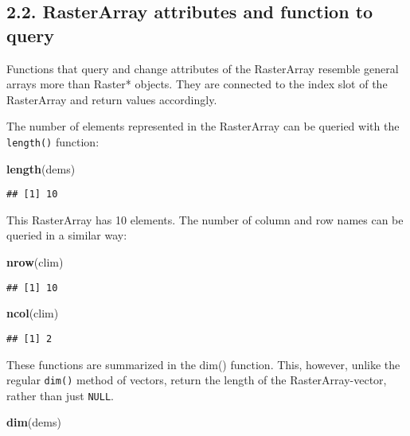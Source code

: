 \documentclass[]{article}
\newenvironment{Shaded}{\begin{snugshade}}{\end{snugshade}}
\newcommand{\KeywordTok}[1]{\textcolor[rgb]{0.13,0.29,0.53}{\textbf{#1}}}
\newcommand{\NormalTok}[1]{#1}
\begin{document}
\subsection{2.2. RasterArray attributes and function to
query}\label{rasterarray-attributes-and-function-to-query}

Functions that query and change attributes of the RasterArray resemble
general arrays more than Raster* objects. They are connected to the
index slot of the RasterArray and return values accordingly.

The number of elements represented in the RasterArray can be queried
with the \texttt{length()} function:

\begin{Shaded}
\begin{Highlighting}[]
\KeywordTok{length}\NormalTok{(dems)}
\end{Highlighting}
\end{Shaded}

\begin{verbatim}
## [1] 10
\end{verbatim}

This RasterArray has 10 elements. The number of column and row names can
be queried in a similar way:

\begin{Shaded}
\begin{Highlighting}[]
\KeywordTok{nrow}\NormalTok{(clim)}
\end{Highlighting}
\end{Shaded}

\begin{verbatim}
## [1] 10
\end{verbatim}

\begin{Shaded}
\begin{Highlighting}[]
\KeywordTok{ncol}\NormalTok{(clim)}
\end{Highlighting}
\end{Shaded}

\begin{verbatim}
## [1] 2
\end{verbatim}

These functions are summarized in the dim() function. This, however,
unlike the regular \texttt{dim()} method of vectors, return the length
of the RasterArray-vector, rather than just \texttt{NULL}.

\begin{Shaded}
\begin{Highlighting}[]
\KeywordTok{dim}\NormalTok{(dems)}
\end{Highlighting}
\end{Shaded}
\end{document}
